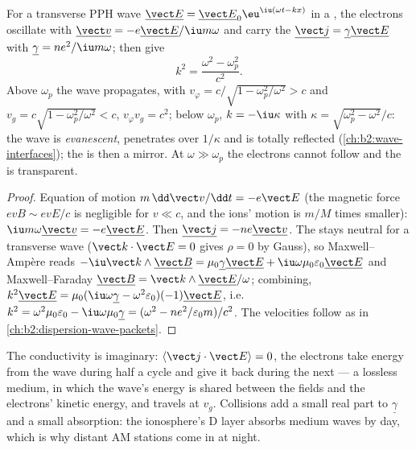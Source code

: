 \begin{theorem}\label{thm:b2:waves-in-media:plasmadispersion}
For a transverse PPH wave $\underline{\vect E} = \underline{\vect E}_0\eu^{\iu(\omega t - kx)}$ in
a , the electrons oscillate with $\underline{\vect v} = -e\underline{\vect E}/\iu m\omega$
and carry the  $\underline{\vect j} = \underline\gamma\underline{\vect E}$ with
$\underline\gamma = ne^2/\iu m\omega$;  then give
\[
k^2 = \frac{\omega^2 - \omega_p^2}{c^2} .
\]
Above $\omega_p$ the wave propagates, with $v_\varphi = c/\sqrt{1 - \omega_p^2/\omega^2}
> c$ and $v_g = c\sqrt{1 - \omega_p^2/\omega^2} < c$, $v_\varphi v_g = c^2$; below
$\omega_p$, $k = -\iu\kappa$ with $\kappa = \sqrt{\omega_p^2 - \omega^2}/c$: the wave is
\emph{evanescent}, penetrates over $1/\kappa$ and is totally reflected
(\cref{ch:b2:wave-interfaces}); the  is then a mirror. At $\omega
\gg \omega_p$ the electrons cannot follow and the  is transparent.
\end{theorem}

\begin{proof}
Equation of motion $m\,\dd\vect v/\dd t = -e\vect E$ (the magnetic force
$ev B \sim evE/c$ is negligible for $v \ll c$, and the ions' motion is
$m/M$ times smaller): $\iu m\omega\underline{\vect v} = -e\underline{\vect E}$. Then
$\underline{\vect j} = -ne\underline{\vect v}$. The  stays neutral for a
transverse wave ($\vect k\cdot\vect E = 0$ gives $\rho = 0$ by Gauss), so
Maxwell--Ampère reads $-\iu\vect k\wedge\underline{\vect B} = \mu_0\underline\gamma\underline{\vect E}
+ \iu\omega\mu_0\varepsilon_0\underline{\vect E}$ and Maxwell--Faraday $\underline{\vect B} = \vect k
\wedge\underline{\vect E}/\omega$; combining, $k^2\underline{\vect E} = \mu_0(\iu\omega\underline\gamma -
\omega^2\varepsilon_0)(-1)\underline{\vect E}$, i.e.\ $k^2 = \omega^2\mu_0\varepsilon_0 - \iu\omega\mu_0
\underline\gamma = (\omega^2 - ne^2/\varepsilon_0m)/c^2$. The velocities follow as in
\cref{ch:b2:dispersion-wave-packets}.
\end{proof}

\begin{remark}\label{rem:b2:waves-in-media:plasmaenergy}
The conductivity is imaginary: $\langle\vect j\cdot\vect E\rangle = 0$, the
electrons take energy from the wave during half a cycle and give it
back during the next --- a lossless medium, in which the wave's energy
is shared between the fields and the electrons' kinetic energy, and
travels at $v_g$. Collisions add a small real part to $\underline\gamma$ and a
small absorption: the ionosphere's D layer absorbs medium waves by
day, which is why distant AM stations come in at night.
\end{remark}

